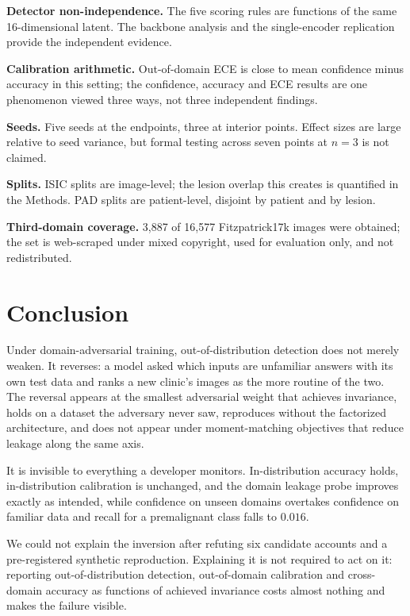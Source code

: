 \documentclass[11pt,a4paper]{article}
\begin{document}
\textbf{Detector non-independence.} The five scoring rules are functions of the
same 16-dimensional latent. The backbone analysis and the single-encoder
replication provide the independent evidence.

\textbf{Calibration arithmetic.} Out-of-domain ECE is close to mean confidence
minus accuracy in this setting; the confidence, accuracy and ECE results are one
phenomenon viewed three ways, not three independent findings.

\textbf{Seeds.} Five seeds at the endpoints, three at interior points. Effect
sizes are large relative to seed variance, but formal testing across seven
points at $n = 3$ is not claimed.

\textbf{Splits.} ISIC splits are image-level; the lesion overlap this creates
is quantified in the Methods. PAD splits are patient-level, disjoint by patient and
by lesion.

\textbf{Third-domain coverage.} 3{,}887 of 16{,}577 Fitzpatrick17k images were
obtained; the set is web-scraped under mixed copyright, used for evaluation only,
and not redistributed.

\section{Conclusion}

Under domain-adversarial training, out-of-distribution detection does not merely
weaken. It reverses: a model asked which inputs are unfamiliar answers with its
own test data and ranks a new clinic's images as the more routine of the two.
The reversal appears at the smallest adversarial weight that achieves
invariance, holds on a dataset the adversary never saw, reproduces without the
factorized architecture, and does not appear under moment-matching objectives
that reduce leakage along the same axis.

It is invisible to everything a developer monitors. In-distribution accuracy
holds, in-distribution calibration is unchanged, and the domain leakage probe
improves exactly as intended, while confidence on unseen domains overtakes
confidence on familiar data and recall for a premalignant class falls to
$0.016$.

We could not explain the inversion after refuting six candidate accounts and a
pre-registered synthetic reproduction. Explaining it is not required to act on
it: reporting out-of-distribution detection, out-of-domain calibration and
cross-domain accuracy as functions of achieved invariance costs almost nothing
and makes the failure visible.
\end{document}
